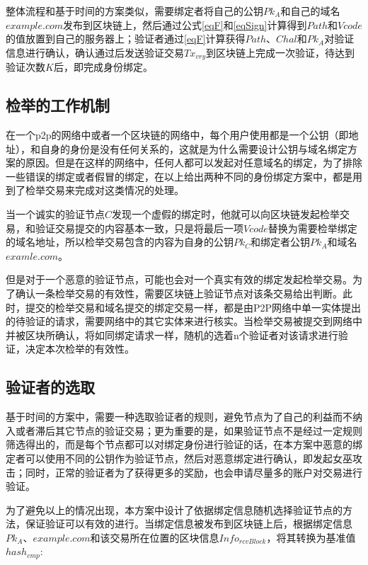 整体流程和基于时间的方案类似，需要绑定者将自己的公钥$Pk_A$和自己的域名$example.com$发布到区块链上，然后通过公式\eqref{eqF}和\eqref{eqSign}计算得到$Path$和$Vcode$的值放置到自己的服务器上；验证者通过\eqref{eqF}计算获得$Path$、$Chal$和$Pk_A$对验证信息进行确认，确认通过后发送验证交易$Tx_{vry}$到区块链上完成一次验证，待达到验证次数$K$后，即完成身份绑定。


\subsection{检举的工作机制}

在一个p2p的网络中或者一个区块链的网络中，每个用户使用都是一个公钥（即地址），和自身的身份是没有任何关系的，这就是为什么需要设计公钥与域名绑定方案的原因。但是在这样的网络中，任何人都可以发起对任意域名的绑定，为了排除一些错误的绑定或者假冒的绑定，在以上给出两种不同的身份绑定方案中，都是用到了检举交易来完成对这类情况的处理。


当一个诚实的验证节点$C$发现一个虚假的绑定时，他就可以向区块链发起检举交易，和验证交易提交的内容基本一致，只是将最后一项$Vcode$替换为需要检举绑定的域名地址，所以检举交易包含的内容为自身的公钥$Pk_C$和绑定者公钥$Pk_A$和域名$examle.com$。


但是对于一个恶意的验证节点，可能也会对一个真实有效的绑定发起检举交易。为了确认一条检举交易的有效性，需要区块链上验证节点对该条交易给出判断。此时，提交的检举交易和域名提交的绑定交易一样，都是由P2P网络中单一实体提出的待验证的请求，需要网络中的其它实体来进行核实。当检举交易被提交到网络中并被区块所确认，将如同绑定请求一样，随机的选着n个验证者对该请求进行验证，决定本次检举的有效性。


\subsection{验证者的选取}

基于时间的方案中，需要一种选取验证者的规则，避免节点为了自己的利益而不纳入或者滞后其它节点的验证交易；更为重要的是，如果验证节点不是经过一定规则筛选得出的，而是每个节点都可以对绑定身份进行验证的话，在本方案中恶意的绑定者可以使用不同的公钥作为验证节点，然后对恶意绑定进行确认，即发起女巫攻击；同时，正常的验证者为了获得更多的奖励，也会申请尽量多的账户对交易进行验证。

为了避免以上的情况出现，本方案中设计了依据绑定信息随机选择验证节点的方法，保证验证可以有效的进行。当绑定信息被发布到区块链上后，根据绑定信息$Pk_A$、$example.com$和该交易所在位置的区块信息$Info_{rcvBlock}$，将其转换为基准值$hash_{cmp}$:

